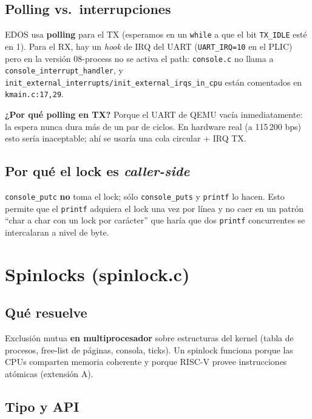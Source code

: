\documentclass[11pt,a4paper]{article}
\begin{document}
\subsection*{Polling vs.\ interrupciones}

EDOS usa \textbf{polling} para el TX (esperamos en un \texttt{while}
a que el bit \texttt{TX\_IDLE} esté en 1). Para el RX, hay un
\emph{hook} de IRQ del UART (\texttt{UART\_IRQ=10} en el PLIC) pero
en la versión 08-process no se activa el path: \texttt{console.c}
no llama a \texttt{console\_interrupt\_handler}, y
\texttt{init\_external\_interrupts/init\_external\_irqs\_in\_cpu}
están comentados en \texttt{kmain.c:17,29}.

\begin{idea}
\textbf{¿Por qué polling en TX?} Porque el UART de QEMU vacía
inmediatamente: la espera nunca dura más de un par de ciclos. En
hardware real (a 115\,200 bps) esto sería inaceptable; ahí se
usaría una cola circular + IRQ TX.
\end{idea}

\subsection*{Por qué el lock es \emph{caller-side}}

\texttt{console\_putc} \textbf{no} toma el lock; sólo
\texttt{console\_puts} y \texttt{printf} lo hacen. Esto permite que
el \texttt{printf} adquiera el lock una vez por línea y no caer en
un patrón ``char a char con un lock por carácter'' que haría que
dos \texttt{printf} concurrentes se intercalaran a nivel de byte.

\section{Spinlocks (spinlock.c)}

\subsection*{Qué resuelve}

Exclusión mutua \textbf{en multiprocesador} sobre estructuras del
kernel (tabla de procesos, free-list de páginas, consola, ticks).
Un spinlock funciona porque las CPUs comparten memoria coherente y
porque RISC-V provee instrucciones atómicas (extensión A).

\subsection*{Tipo y API}
\end{document}
